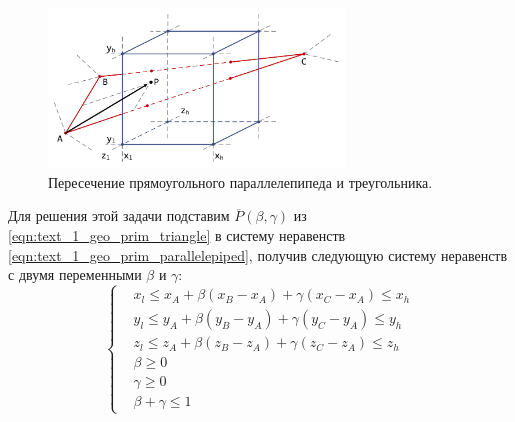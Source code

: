 \begin{figure}[ht]
	\centering
	\includegraphics[width=0.7\textwidth]{./pics/text_1_geo_prim/tri_block_intersect.pdf}
	\caption{Пересечение прямоугольного параллелепипеда и треугольника.}
	\label{fig:text_1_geo_prim_tri_block_intersect}
\end{figure}

Для решения этой задачи подставим $\overline{P}(\beta, \gamma)$ из \eqref{eqn:text_1_geo_prim_triangle} в систему неравенств \eqref{eqn:text_1_geo_prim_parallelepiped}, получив следующую систему неравенств с двумя переменными $\beta$ и $\gamma$:
\begin{equation}\label{eqn:text_1_geo_prim_1}
	\left\{
		\begin{aligned}
			& x_l \le x_A + \beta (x_B - x_A) + \gamma (x_C - x_A) \le x_h \\
			& y_l \le y_A + \beta (y_B - y_A) + \gamma (y_C - y_A) \le y_h \\
			& z_l \le z_A + \beta (z_B - z_A) + \gamma (z_C - z_A) \le z_h \\
			& \beta \ge 0 \\
			& \gamma \ge 0 \\
			& \beta + \gamma \le 1
		\end{aligned}
	\right.
\end{equation}

